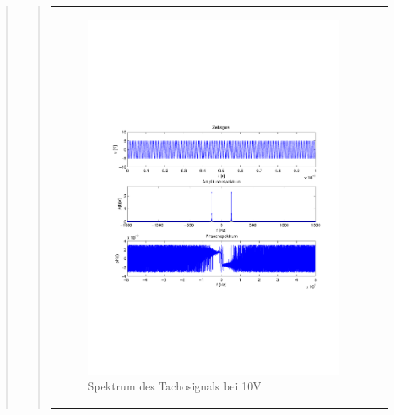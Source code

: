 \begin{quote}
\begin{quote}
        \begin{center}
                \begin{tabular}{ll}
    
                \hspace{-12em}
                    \begin{minipage}{0.6\textwidth}
    
                        \begin{figure}[H]
                            \label{fig:}
                            \includegraphics[scale=0.45, trim = 0.8cm 7cm 3cm
                            8.5cm, clip]{./Bilder/Termin7/ampl_spektrum_messung1_tacho}
                            \caption{Spektrum des Tachosignals bei 10V}
                        \end{figure}
    

\end{minipage}
\end{tabular}
\end{center}
\end{quote}
\end{quote}
